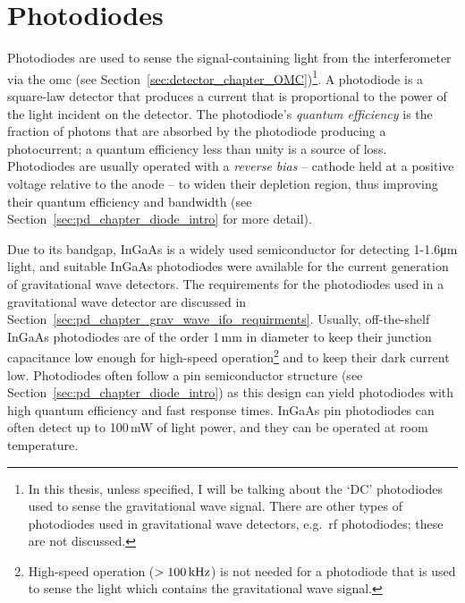 \section{Photodiodes}
\label{sec:detector_chapter_photodiodes}
Photodiodes are used to sense the signal-containing light from the interferometer via the \gls{omc} (see Section~\ref{sec:detector_chapter_OMC})\footnote{In this thesis, unless specified, I will be talking about the `DC' photodiodes used to sense the gravitational wave signal. There are other types of photodiodes used in gravitational wave detectors, e.g.~\gls{rf} photodiodes; these are not discussed.}. A photodiode is a square-law detector that produces a current that is proportional to the power of the light incident on the detector. The photodiode's \emph{quantum efficiency} is the fraction of photons that are absorbed by the photodiode producing a photocurrent; a quantum efficiency less than unity is a source of loss. Photodiodes are usually operated with a \emph{reverse bias} -- cathode held at a positive voltage relative to the anode -- to widen their depletion region, thus improving their quantum efficiency and bandwidth (see Section~\ref{sec:pd_chapter_diode_intro} for more detail).
\par
Due to its bandgap, InGaAs is a widely used semiconductor for detecting 1-1.6\si{\micro\metre} light, and suitable InGaAs photodiodes were available for the current generation of gravitational wave detectors. The requirements for the photodiodes used in a gravitational wave detector are discussed in Section~\ref{sec:pd_chapter_grav_wave_ifo_requirments}. Usually, off-the-shelf InGaAs photodiodes are of the order 1\,mm in diameter to keep their junction capacitance low enough for high-speed operation\footnote{High-speed operation ($>100\,\rm{kHz}$) is not needed for a photodiode that is used to sense the light which contains the gravitational wave signal.} and to keep their dark current low. Photodiodes often follow a \gls{pin} semiconductor structure (see Section~\ref{sec:pd_chapter_diode_intro}) as this design can yield photodiodes with high quantum efficiency and fast response times. InGaAs \gls{pin} photodiodes can often detect up to 100\,mW of light power, and they can be operated at room temperature. 
\par
